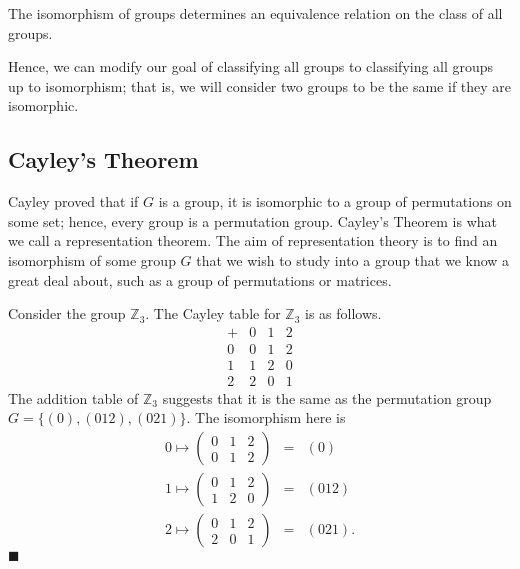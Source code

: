\begin{theorem}\label{isomorph_theorem_5}
The isomorphism of groups determines an equivalence relation on the class of all groups. 
\end{theorem}
 
Hence, we can modify our goal of classifying all groups to classifying all groups {\bfi up to isomorphism}; that is, we will consider two groups to be the same if they are isomorphic.

 
\subsection*{Cayley's Theorem}

Cayley proved that if $G$ is a group, it is isomorphic to a group of permutations on some set; hence, every group is a permutation group.  Cayley's Theorem is what  we call a representation theorem.  The aim of representation theory is to find an isomorphism of some group $G$ that we wish to study into a group that we know a great deal about, such as a group of permutations or matrices.

\medskip

Consider the group ${\mathbb Z}_3$.  The Cayley table for ${\mathbb Z}_3$ is as follows. 
$$
\begin{array}{c|ccc}
+     & 0 & 1 & 2 \\
\hline
0     & 0 & 1 & 2 \\
1     & 1 & 2 & 0 \\
2     & 2 & 0 & 1
\end{array}
$$
The addition table of ${\mathbb Z}_3$ suggests that it is the same as the permutation group $G = \{ (0), (0 1 2), (0 2 1) \}$.  The isomorphism here is 
\begin{eqnarray*}
0 \mapsto
\begin{pmatrix}
0 & 1 & 2 \\
0 & 1 & 2
\end{pmatrix}
& = & (0) \\
1 \mapsto
\begin{pmatrix}
0 & 1 & 2 \\
1 & 2 & 0
\end{pmatrix}
& = & (0 1 2) \\
2 \mapsto
\begin{pmatrix}
0 & 1 & 2 \\
2 & 0 & 1
\end{pmatrix}
& = & (0 2 1).
\end{eqnarray*}
\hspace{\fill} $\blacksquare$
 
